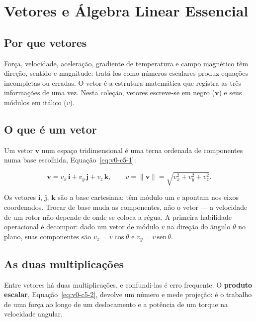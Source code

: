 \documentclass[12pt,a4paper]{article}
\numberwithin{equation}{section}
\numberwithin{table}{section}
\numberwithin{figure}{section}
\begin{document}
\clearpage
\section{Vetores e Álgebra Linear Essencial}\label{sec:v0-vetores}

\subsection{Por que vetores}

Força, velocidade, aceleração, gradiente de temperatura e campo magnético
têm direção, sentido e magnitude: tratá-los como números escalares
produz equações incompletas ou erradas. O vetor é a estrutura matemática
que registra as três informações de uma vez. Nesta coleção, vetores
escreve-se em negro ($\bm{v}$) e seus módulos em itálico ($v$).

\subsection{O que é um vetor}

Um vetor $\bm{v}$ num espaço tridimensional é uma terna ordenada de
componentes numa base escolhida, Equação~\eqref{eq:v0-c5-1}:

\begin{equation}\label{eq:v0-c5-1}
\bm{v} = v_x\,\bm{i} + v_y\,\bm{j} + v_z\,\bm{k},
\qquad
v = \lVert\bm{v}\rVert = \sqrt{v_x^2 + v_y^2 + v_z^2}.
\end{equation}

Os vetores $\bm{i}$, $\bm{j}$, $\bm{k}$ são a base cartesiana: têm módulo
um e apontam nos eixos coordenados. Trocar de base muda as componentes,
não o vetor --- a velocidade de um rotor não depende de onde se coloca a
régua. A primeira habilidade operacional é decompor: dado um vetor de
módulo $v$ na direção do ângulo $\theta$ no plano, suas componentes são
$v_x = v\cos\theta$ e $v_y = v\,\mathrm{sen}\,\theta$.

\subsection{As duas multiplicações}

Entre vetores há duas multiplicações, e confundi-las é erro frequente. O
\textbf{produto escalar}, Equação~\eqref{eq:v0-c5-2}, devolve um número e
mede projeção: é o trabalho de uma força ao longo de um deslocamento e a
potência de um torque na velocidade angular.
\end{document}
